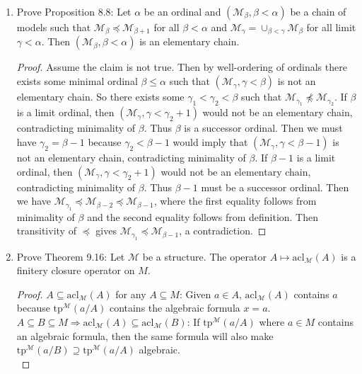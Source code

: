 \documentclass{article}
\begin{document}
\begin{enumerate}[label={\bf Q\arabic*:}]
  \item Prove Proposition 8.8: Let $\alpha$ be an ordinal and
    $(\mathcal{M}_\beta,\beta<\alpha)$ be a chain of models such that
    $\mathcal{M}_\beta\preceq\mathcal{M}_{\beta+1}$ for all $\beta<\alpha$
    and $\mathcal{M}_\gamma=\cup_{\beta<\gamma}\mathcal{M}_\beta$ for all
    limit $\gamma<\alpha$. Then $(\mathcal{M}_\beta,\beta<\alpha)$ is an
    elementary chain.

    \begin{proof}
      Assume the claim is not true. Then by well-ordering of ordinals there
      exists some minimal ordinal $\beta\leq\alpha$ such that
      $(\mathcal{M}_\gamma,\gamma<\beta)$ is not an elementary chain. So
      there exists some $\gamma_1<\gamma_2<\beta$ such that
      $\mathcal{M}_{\gamma_1}\not\preceq\mathcal{M}_{\gamma_2}$. If $\beta$
      is a limit ordinal, then $(\mathcal{M}_\gamma,\gamma<\gamma_2+1)$
      would not be an elementary chain, contradicting minimality of
      $\beta$. Thus $\beta$ is a successor ordinal. Then we must have
      $\gamma_2=\beta-1$ because $\gamma_2<\beta-1$ would imply that
      $(\mathcal{M}_\gamma,\gamma<\beta-1)$ is not an elementary chain,
      contradicting minimality of $\beta$. If $\beta-1$ is a limit ordinal,
      then $(\mathcal{M}_\gamma,\gamma<\gamma_2+1)$ would not be an
      elementary chain, contradicting minimality of $\beta$. Thus $\beta-1$
      must be a successor ordinal. Then we have $\mathcal{M}_{\gamma_1}
      \preceq\mathcal{M}_{\beta-2} \preceq\mathcal{M}_{\beta-1}$, where the
      first equality follows from minimality of $\beta$ and the second
      equality follows from definition. Then transitivity of $\preceq$
      gives $\mathcal{M}_{\gamma_1}\preceq\mathcal{M}_{\beta-1}$, a
      contradiction.
    \end{proof}

  \item Prove Theorem 9.16: Let $\mathcal{M}$ be a structure. The operator
    $A\mapsto\text{acl}_\mathcal{M}(A)$ is a finitery closure operator on
    $M$.

    \begin{proof}
      $A\subseteq\text{acl}_\mathcal{M}(A)$ for any $A\subseteq M$:
      Given $a\in A$, $\text{acl}_\mathcal{M}(A)$ contains $a$ because
      $\text{tp}^{\mathcal{M}}(a/A)$ contains the algebraic formula $x=a$.
      \\

      $A\subseteq B\subseteq M\Rightarrow \text{acl}_\mathcal{M}(A)
      \subseteq\text{acl}_\mathcal{M}(B)$:
      If $\text{tp}^{\mathcal{M}}(a/A)$ where $a\in M$ contains an
      algebraic formula, then the same formula will also make
      $\text{tp}^{\mathcal{M}}(a/B) \supseteq\text{tp}^{\mathcal{M}}(a/A)$
      algebraic. \\


\end{proof}
\end{enumerate}
\end{document}

